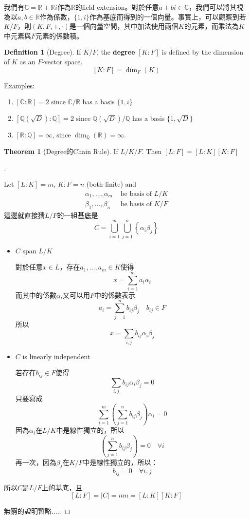 \documentclass{article}
\theoremstyle{definition}
\newtheorem{thm}{Theorem}
\newcommand{\ex}{\noindent\underline{Examples:}}
\newtheorem{dfn}{Definition}
\newenvironment{proofs}[1][\proofname]{%
  \begin{proof}[#1]$ $\par\nobreak\ignorespaces
}{%
  \end{proof}
}
\newcommand{\CC}{\mathbb C}
\newcommand{\QQ}{\mathbb Q}
\newcommand{\RR}{\mathbb R}
\begin{document}
我們有$\CC=\RR+\RR i$作為$\RR$的field extension。對於任意$a+bi\in\CC$，我們可以將其視為以$a,b\in \RR$作為係數，$\{1,i\}$作為基底而得到的一個向量。事實上，可以觀察到若$K/F$，則$(K,F,+,\cdot)$是一個向量空間，其中加法使用兩個$K$的元素，而乘法為$K$中元素與$F$元素的係數積。

\begin{dfn}[Degree]
	If $K/F$, the \textbf{degree} $[K:F]$ is defined by the dimension of $K$ as an $F$-vector space.
	\[ [K:F]=\dim_F(K) \]
\end{dfn}

\ex

\begin{enumerate}
	\item $[\CC: \RR]=2$ since $\CC /\RR $ has a basis $\{1,i\}$
	\item $[\QQ(\sqrt{D}):\QQ]=2$ since $\QQ(\sqrt{D})/\QQ$ has a basis $\{1,\sqrt{D}\}$
	\item $[\RR:\QQ]=\infty$, since $\dim_\QQ(\RR)=\infty$.
\end{enumerate}

\begin{thm}[Degree的Chain Rule]
	If $L/K/F$. Then $[L:F]=[L:K][K:F]$
\end{thm}

\begin{proofs}
	Let $[L:K]=m$, $K:F=n$ (both finite) and
	\begin{align*}
		\alpha_1,\dots,\alpha_m & \text{ be basis of } L/K \\
		\beta_1,\dots, \beta_n  & \text{ be basis of } K/F
	\end{align*}
	這邊就直接猜$L/F$的一組基底是
	\[
		C=\bigcup_{i=1}^m \bigcup_{j=1}^n \left\{\alpha_i\beta_j\right\}
	\]
	\begin{itemize}
		\item $C$ span $L/K$

		      對於任意$x\in L$，存在$a_1,\dots,a_m\in K$使得
		      \[x=\sum_{i=1}^m a_i \alpha_i\]
		      而其中的係數$\alpha_i$又可以用$F$中的係數表示
		      \[a_i=\sum_{j=1}^n b_{ij}\beta_j\quad b_{ij}\in F\]
		      所以
		      \[x=\sum_{i,j} b_{ij} \boxed{\alpha_i \beta_j}\]

		\item $C$ is linearly independent

		      若存在$b_{ij}\in F$使得
		      \[\sum_{i,j} b_{ij} {\alpha_i \beta_j}=0\]
		      只要寫成
		      \[\sum_{i = 1}^{m}\left(\sum_{j = 1}^{n}b_{ij}\beta_j\right) \alpha_i = 0\]
		      因為$\alpha_i$在$L/K$中是線性獨立的，所以
		      \[\left(\sum_{j = 1}^{n}b_{ij}\beta_j\right) = 0 \quad \forall i\]
		      再一次，因為$\beta_j$在$K/F$中是線性獨立的，所以：
		      \[b_{ij} = 0 \quad \forall i,j\]
	\end{itemize}
	所以$C$是$L/F$上的基底，且
	\[[L:F]=|C|=mn=[L:K][K:F]\]

	無窮的證明暫略.....
\end{proofs}
\end{document}
